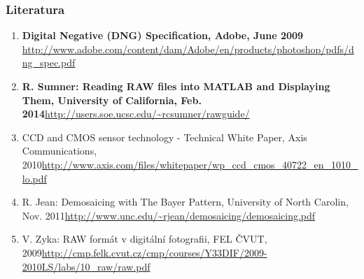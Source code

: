 \documentclass{beamer}
\begin{document}
	\begin{frame}
		\frametitle{Literatura}
		\begin{enumerate}
			\scriptsize
	    	\item \textbf{Digital Negative (DNG) Specification, Adobe, June 2009} \newline \url{http://www.adobe.com/content/dam/Adobe/en/products/photoshop/pdfs/dng_spec.pdf}	    	
	    	\item \textbf{R. Sumner: Reading RAW files into MATLAB and Displaying Them, University of California, Feb. 2014\newline}\url{http://users.soe.ucsc.edu/~rcsumner/rawguide/}

			\item CCD and CMOS sensor technology - Technical White Paper, Axis Communications, 2010\newline\tiny{\url{http://www.axis.com/files/whitepaper/wp_ccd_cmos_40722_en_1010_lo.pdf}}\scriptsize
			\item R. Jean: Demosaicing with The Bayer Pattern, University of North Carolin, Nov. 2011\newline\url{http://www.unc.edu/~rjean/demosaicing/demosaicing.pdf}
	    	\item V. Zyka: RAW formát v digitální fotografii, FEL ČVUT, 2009\newline\url{http://cmp.felk.cvut.cz/cmp/courses/Y33DIF/2009-2010LS/labs/10_raw/raw.pdf}
	    \end{enumerate}    	
	\end{frame}
	
\end{document}
